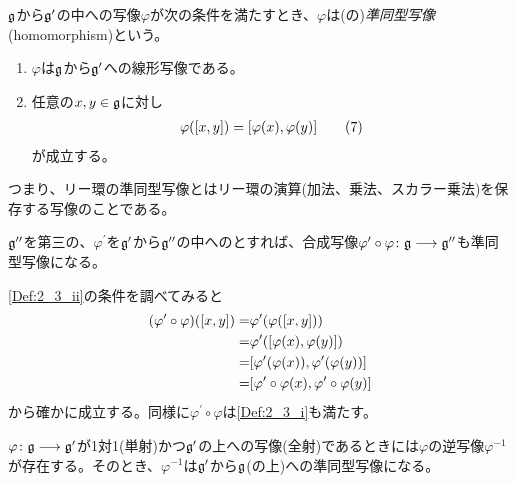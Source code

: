\documentclass[fleqn,twocolumn,titlepage,dvipdfmx]{jsarticle}
\begin{document}
\begin{definition}[準同型写像]\label{Def:2_3}
  $\mathfrak{g}$から$\mathfrak{g}^\prime$の中への写像$\varphi$が次の条件を満たすとき、$\varphi$は({}の)\emph{準同型写像}(homomorphism)という。
  \begin{enumerate}[label=(\roman*)]
    \item \label{Def:2_3_i}$\varphi$は$\mathfrak{g}$から$\mathfrak{g}^\prime$への線形写像である。
    \item \label{Def:2_3_ii}任意の$x,y\in\mathfrak{g}$に対し
      \begin{align*}
        \varphi\qty(\comm{x}{y}) = \comm{\varphi(x)}{\varphi(y)}\tag{7}\label{eq:2_(7)}
      \end{align*}
      が成立する。
  \end{enumerate}
  つまり、リー環の準同型写像とはリー環の演算(加法、乗法、スカラー乗法)を保存する写像のことである。
\end{definition}

\begin{theorem}[合成写像]
  $\mathfrak{g}^{{\prime\prime}}$を第三の{}、$\varphi^\prime$を$\mathfrak{g}^\prime$から$\mathfrak{g}^{{\prime\prime}}$の中への{}とすれば、合成写像$\varphi^\prime\circ\varphi\colon\mathfrak{g}\longrightarrow\mathfrak{g}^{{\prime\prime}}$も準同型写像になる。
\end{theorem}

\begin{Proof}
  \ref{Def:2_3_ii}の条件を調べてみると
  \begin{align*}
    \qty(\varphi^{\prime}\circ\varphi)\qty(\comm{x}{y}) =& \varphi^{\prime}\qty(\varphi\qty(\comm{x}{y}))\\
    =& \varphi^{\prime}\qty(\comm{\varphi(x)}{\varphi(y)})\\
    =& \comm{\varphi^{\prime}\qty(\varphi(x))}{\varphi^{\prime}(\varphi(y))}\\
    =& \comm{\varphi^{\prime}\circ\varphi(x)}{\varphi^{\prime}\circ\varphi(y)}
  \end{align*}
  から確かに成立する。同様に$\varphi^{\prime}\circ\varphi$は\ref{Def:2_3_i}も満たす。
\end{Proof}

\begin{theorem}[逆写像の準同型写像]
  {}$\varphi\colon\mathfrak{g}\longrightarrow\mathfrak{g}^{\prime}$が1対1(単射)かつ$\mathfrak{g}^{\prime}$の上への写像(全射)であるときには$\varphi$の逆写像$\varphi^{-1}$が存在する。そのとき、$\varphi^{-1}$は$\mathfrak{g}^{\prime}$から$\mathfrak{g}$(の上)への準同型写像になる。
\end{theorem}
\end{document}
